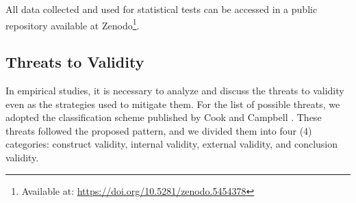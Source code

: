 All data collected and used for statistical tests can be accessed in a public repository available at Zenodo\footnote{Available at: \url{https://doi.org/10.5281/zenodo.5454378}}.

\subsection{Threats to Validity}
\label{ssec_experiments:preliminary_threats}

In empirical studies, it is necessary to analyze and discuss the threats to validity even as the strategies used to mitigate them.
For the list of possible threats, we adopted the classification scheme published by Cook and Campbell \cite{Cook:1979}. 
These threats followed the proposed pattern, and we divided them into four (4) categories: construct validity, internal validity, external validity, and conclusion validity.


